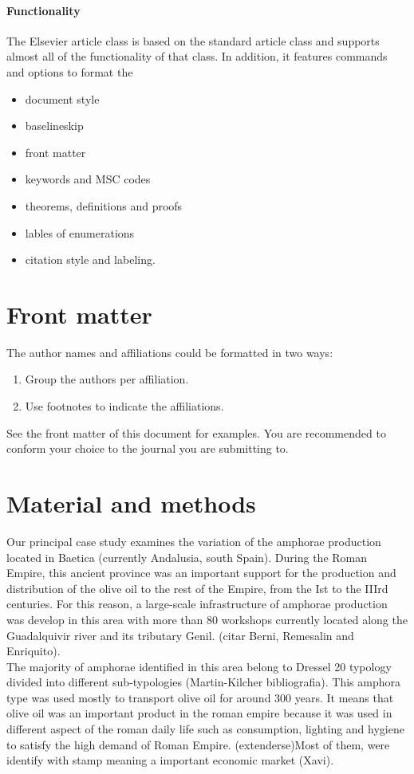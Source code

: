 \documentclass[review]{elsarticle}
\begin{document}
\paragraph{Functionality} The Elsevier article class is based on the standard article class and supports almost all of the functionality of that class. In addition, it features commands and options to format the
\begin{itemize}
\item document style
\item baselineskip
\item front matter
\item keywords and MSC codes
\item theorems, definitions and proofs
\item lables of enumerations
\item citation style and labeling.
\end{itemize}

\section{Front matter}

The author names and affiliations could be formatted in two ways:
\begin{enumerate}[(1)]
\item Group the authors per affiliation.
\item Use footnotes to indicate the affiliations.
\end{enumerate}
See the front matter of this document for examples. You are recommended to conform your choice to the journal you are submitting to.


\section{Material and methods}

Our principal case study examines the variation of the amphorae production located in Baetica (currently Andalusia, south Spain). During the Roman Empire, this ancient province was an important support for the production and distribution of the olive oil to the rest of the Empire, from the Ist to the IIIrd centuries. For this reason, a large-scale infrastructure of amphorae production was develop in this area with more than 80 workshops currently located along the Guadalquivir river and its tributary Genil. (citar Berni, Remesalin and Enriquito).
\\
The majority of amphorae identified in this area belong to Dressel 20 typology divided into different sub-typologies (Martin-Kilcher bibliografia). This amphora type was used mostly to transport olive oil for around 300 years. It means that olive oil was an important product in the roman empire because it was used in different aspect of the roman daily life such as consumption, lighting and hygiene to satisfy the high demand of Roman Empire. (extenderse)Most of them, were identify with stamp meaning a important economic market (Xavi).  
\end{document}
